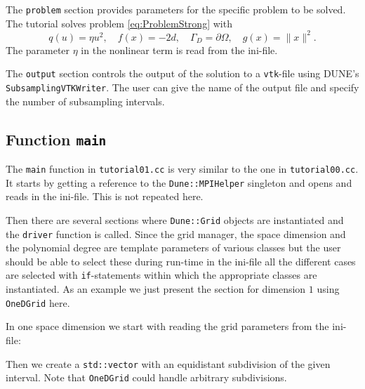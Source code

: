 \documentclass[a4paper,12pt]{article}
\begin{document}

The \lstinline{problem} section provides parameters for the
specific problem to be solved. The tutorial solves problem \eqref{eq:ProblemStrong}
with $$q(u)=\eta u^2, \quad f(x) = -2d, \quad \Gamma_D=\partial\Omega,
\quad g(x)=\|x\|^2 .$$
The parameter $\eta$ in the nonlinear term is read from the ini-file.


The \lstinline{output} section controls the output of the solution
to a \lstinline{vtk}-file using DUNE's \lstinline{SubsamplingVTKWriter}.
The user can give the name of the output file and specify the number of subsampling intervals.

\subsection{Function \lstinline{main}}

The \lstinline{main} function  in \lstinline{tutorial01.cc} is very similar to the one
in \lstinline{tutorial00.cc}. It starts by getting a reference to the
\lstinline{Dune::MPIHelper} singleton and opens and reads in the ini-file. 
This is not repeated here.

Then there are several sections where \lstinline{Dune::Grid} objects are instantiated
and the \lstinline{driver} function is called. Since the grid manager, the space
dimension and the polynomial degree are template parameters of various classes
but the user should be able to select these during run-time in the ini-file all 
the different cases are selected with \lstinline{if}-statements within which
the appropriate classes are instantiated. As an example we just
present the section for dimension $1$ using \lstinline{OneDGrid} here.

In one space dimension we start with reading the grid parameters 
from the ini-file:


Then we create a \lstinline{std::vector} with an equidistant
subdivision of the given interval. Note that \lstinline{OneDGrid}
could handle arbitrary subdivisions.

\end{document}

